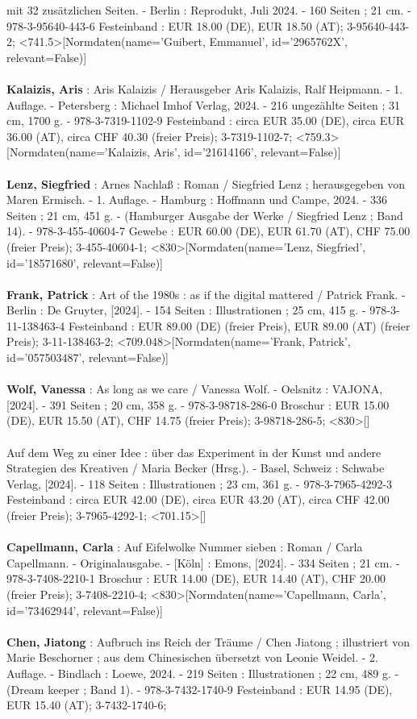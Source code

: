 \documentclass{article}
\begin{document}
\begin{multicols}{3}
mit 32 zusätzlichen Seiten. - Berlin : Reprodukt, Juli 2024. - 160 Seiten ; 21 cm. - 978-3-95640-443-6 Festeinband : EUR 18.00 (DE), EUR 18.50 (AT); 3-95640-443-2; <741.5>[Normdaten(name='Guibert, Emmanuel', id='2965762X', relevant=False)]\\\\\textbf{Kalaizis, Aris} : Aris Kalaizis / Herausgeber Aris Kalaizis, Ralf Heipmann. - 1. Auflage. - Petersberg : Michael Imhof Verlag, 2024. - 216 ungezählte Seiten ; 31 cm, 1700 g. - 978-3-7319-1102-9 Festeinband : circa EUR 35.00 (DE), circa EUR 36.00 (AT), circa CHF 40.30 (freier Preis); 3-7319-1102-7; <759.3>[Normdaten(name='Kalaizis, Aris', id='21614166', relevant=False)]\\\\\textbf{Lenz, Siegfried} : Arnes Nachlaß : Roman / Siegfried Lenz ; herausgegeben von Maren Ermisch. - 1. Auflage. - Hamburg : Hoffmann und Campe, 2024. - 336 Seiten ; 21 cm, 451 g. - (Hamburger Ausgabe der Werke / Siegfried Lenz ; Band 14). - 978-3-455-40604-7 Gewebe : EUR 60.00 (DE), EUR 61.70 (AT), CHF 75.00 (freier Preis); 3-455-40604-1; <830>[Normdaten(name='Lenz, Siegfried', id='18571680', relevant=False)]\\\\\textbf{Frank, Patrick} : Art of the 1980s : as if the digital mattered / Patrick Frank. - Berlin : De Gruyter, [2024]. - 154 Seiten : Illustrationen ; 25 cm, 415 g. - 978-3-11-138463-4 Festeinband : EUR 89.00 (DE) (freier Preis), EUR 89.00 (AT) (freier Preis); 3-11-138463-2; <709.048>[Normdaten(name='Frank, Patrick', id='057503487', relevant=False)]\\\\\textbf{Wolf, Vanessa} : As long as we care / Vanessa Wolf. - Oelsnitz : VAJONA, [2024]. - 391 Seiten ; 20 cm, 358 g. - 978-3-98718-286-0 Broschur : EUR 15.00 (DE), EUR 15.50 (AT), CHF 14.75 (freier Preis); 3-98718-286-5; <830>[]\\\\Auf dem Weg zu einer Idee : über das Experiment in der Kunst und andere Strategien des Kreativen / Maria Becker (Hrsg.). - Basel, Schweiz : Schwabe Verlag, [2024]. - 118 Seiten : Illustrationen ; 23 cm, 361 g. - 978-3-7965-4292-3 Festeinband : circa EUR 42.00 (DE), circa EUR 43.20 (AT), circa CHF 42.00 (freier Preis); 3-7965-4292-1; <701.15>[]\\\\\textbf{Capellmann, Carla} : Auf Eifelwolke Nummer sieben : Roman / Carla Capellmann. - Originalausgabe. - [Köln] : Emons, [2024]. - 334 Seiten ; 21 cm. - 978-3-7408-2210-1 Broschur : EUR 14.00 (DE), EUR 14.40 (AT), CHF 20.00 (freier Preis); 3-7408-2210-4; <830>[Normdaten(name='Capellmann, Carla', id='73462944', relevant=False)]\\\\\textbf{Chen, Jiatong} : Aufbruch ins Reich der Träume / Chen Jiatong ; illustriert von Marie Beschorner ; aus dem Chinesischen übersetzt von Leonie Weidel. - 2. Auflage. - Bindlach : Loewe, 2024. - 219 Seiten : Illustrationen ; 22 cm, 489 g. - (Dream keeper ; Band 1). - 978-3-7432-1740-9 Festeinband : EUR 14.95 (DE), EUR 15.40 (AT); 3-7432-1740-6; 
\end{multicols}
\end{document}
